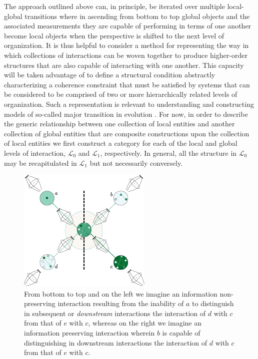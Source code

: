 \documentclass[aps,twocolumn]{revtex4-1}
\begin{document}
The approach outlined above can, in principle, be iterated over multiple local-global transitions where in ascending from bottom to top global objects and the associated measurements they are capable of performing in terms of one another become local objects when the perspective is shifted to the next level of organization. It is thus helpful to consider a method for representing the way in which collections of interactions can be woven together to produce higher-order structures that are also capable of interacting with one another. This capacity will be taken advantage of to define a structural condition abstractly characterizing a coherence constraint that must be satisfied by systems that can be considered to be comprised of two or more hierarchically related levels of organization. Such a representation is relevant to understanding and constructing models of so-called major transition in evolution \cite{MaynardSmith1995,Okasha2006,Calcott2011}. For now, in order to describe the generic relationship between one collection of local entities and another collection of global entities that are composite constructions upon the collection of local entities we first construct a category for each of the local and global levels of interaction, $\mathcal{L}_0$ and $\mathcal{L}_1$, respectively. In general, all the structure in $\mathcal{L}_0$ may be recapitulated in $\mathcal{L}_1$ but not necessarily conversely.

\begin{figure}
\noindent\includegraphics[width=0.9\columnwidth]{fig/infopres.pdf}
\caption{From bottom to top and on the left we imagine an information non-preserving interaction resulting from the inability of $a$ to distinguish in subsequent or {\it downstream} interactions the interaction of $d$  with $c$ from that of $e$ with $c$, whereas on the right we imagine an information preserving interaction wherein $b$ is capable of distinguishing in downstream interactions the interaction of $d$  with $c$ from that of $e$ with $c$.}
\label{fig:infopres}
\end{figure}
\end{document}
